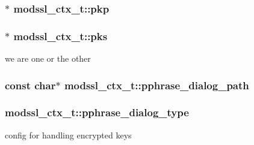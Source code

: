 \subsubsection[{\texorpdfstring{pkp}{pkp}}]{$\ast$ modssl\+\_\+ctx\+\_\+t\+::pkp}\hypertarget{structmodssl__ctx__t_acb20829f01057f58d94469af712880c2}{}\label{structmodssl__ctx__t_acb20829f01057f58d94469af712880c2}
\subsubsection[{\texorpdfstring{pks}{pks}}]{$\ast$ modssl\+\_\+ctx\+\_\+t\+::pks}\hypertarget{structmodssl__ctx__t_ad3ccaab1e3c37050d9eecc3c830d7a89}{}\label{structmodssl__ctx__t_ad3ccaab1e3c37050d9eecc3c830d7a89}
we are one or the other 
\subsubsection[{\texorpdfstring{pphrase\+\_\+dialog\+\_\+path}{pphrase_dialog_path}}]{\setlength{\rightskip}{0pt plus 5cm}const char$\ast$ modssl\+\_\+ctx\+\_\+t\+::pphrase\+\_\+dialog\+\_\+path}\hypertarget{structmodssl__ctx__t_aa49d72ee17088961d6e84bac67c99b47}{}\label{structmodssl__ctx__t_aa49d72ee17088961d6e84bac67c99b47}
\subsubsection[{\texorpdfstring{pphrase\+\_\+dialog\+\_\+type}{pphrase_dialog_type}}]{ modssl\+\_\+ctx\+\_\+t\+::pphrase\+\_\+dialog\+\_\+type}\hypertarget{structmodssl__ctx__t_a1fe0b0fdd63583304dae0dfd85982771}{}\label{structmodssl__ctx__t_a1fe0b0fdd63583304dae0dfd85982771}
config for handling encrypted keys 
